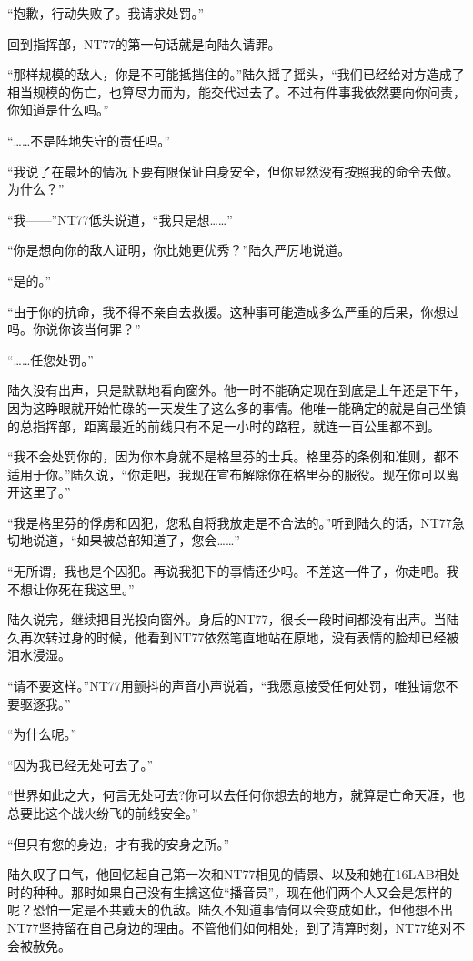 “抱歉，行动失败了。我请求处罚。”

回到指挥部，NT77的第一句话就是向陆久请罪。

“那样规模的敌人，你是不可能抵挡住的。”陆久摇了摇头，“我们已经给对方造成了相当规模的伤亡，也算尽力而为，能交代过去了。不过有件事我依然要向你问责，你知道是什么吗。”

“……不是阵地失守的责任吗。”

“我说了在最坏的情况下要有限保证自身安全，但你显然没有按照我的命令去做。为什么？”

“我——”NT77低头说道，“我只是想……”

“你是想向你的敌人证明，你比她更优秀？”陆久严厉地说道。

“是的。”

“由于你的抗命，我不得不亲自去救援。这种事可能造成多么严重的后果，你想过吗。你说你该当何罪？”

“……任您处罚。”

陆久没有出声，只是默默地看向窗外。他一时不能确定现在到底是上午还是下午，因为这睁眼就开始忙碌的一天发生了这么多的事情。他唯一能确定的就是自己坐镇的总指挥部，距离最近的前线只有不足一小时的路程，就连一百公里都不到。

“我不会处罚你的，因为你本身就不是格里芬的士兵。格里芬的条例和准则，都不适用于你。”陆久说，“你走吧，我现在宣布解除你在格里芬的服役。现在你可以离开这里了。”

“我是格里芬的俘虏和囚犯，您私自将我放走是不合法的。”听到陆久的话，NT77急切地说道，“如果被总部知道了，您会……”

“无所谓，我也是个囚犯。再说我犯下的事情还少吗。不差这一件了，你走吧。我不想让你死在我这里。”

陆久说完，继续把目光投向窗外。身后的NT77，很长一段时间都没有出声。当陆久再次转过身的时候，他看到NT77依然笔直地站在原地，没有表情的脸却已经被泪水浸湿。

“请不要这样。”NT77用颤抖的声音小声说着，“我愿意接受任何处罚，唯独请您不要驱逐我。”

“为什么呢。”

“因为我已经无处可去了。”

“世界如此之大，何言无处可去?你可以去任何你想去的地方，就算是亡命天涯，也总要比这个战火纷飞的前线安全。”

“但只有您的身边，才有我的安身之所。”

陆久叹了口气，他回忆起自己第一次和NT77相见的情景、以及和她在16LAB相处时的种种。那时如果自己没有生擒这位“播音员”，现在他们两个人又会是怎样的呢？恐怕一定是不共戴天的仇敌。陆久不知道事情何以会变成如此，但他想不出NT77坚持留在自己身边的理由。不管他们如何相处，到了清算时刻，NT77绝对不会被赦免。

